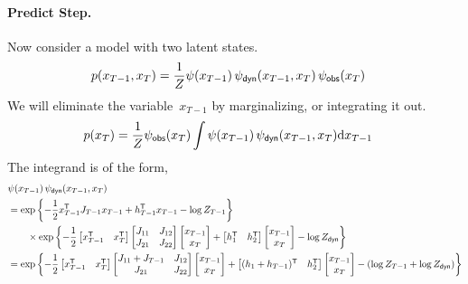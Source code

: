\documentclass{article}
\begin{document}
\paragraph{Predict Step.} Now consider a model with two latent states. 
\begin{align}
  p(x_{T-1}, x_T) &= \frac{1}{Z} \psi(x_{T-1}) \, \psi_{\sf dyn}(x_{T-1}, x_T) \, \psi_{\sf obs}(x_T)
\end{align}
We will eliminate the variable~$x_{T-1}$ by marginalizing, or integrating it out.
\begin{align}
  p(x_T) &= \frac{1}{Z} \psi_{\sf obs}(x_T) \int \psi(x_{T-1}) \, \psi_{\sf dyn}(x_{T-1}, x_T) \mathrm{d}x_{T-1}
\end{align}
The integrand is of the form,
\begin{align}
  &\psi(x_{T-1}) \, \psi_{\sf dyn}(x_{T-1}, x_T)
  \\
  &= \exp \left \{ -\frac{1}{2} x_{T-1}^{\mathsf{T}} J_{T-1} x_{T-1} + h_{T-1}^{\mathsf{T}} x_{T-1} - \log Z_{T-1} \right \} \\
  &\qquad \times 
  \exp \left \{ - \frac{1}{2}
  \begin{bmatrix} x_{T-1}^{\mathsf{T}} & x_T^{\mathsf{T}} \end{bmatrix} 
  \begin{bmatrix} J_{11} & J_{12} \\ J_{21} & J_{22} \end{bmatrix}
  \begin{bmatrix} x_{T-1} \\  x_T \end{bmatrix}
  + \begin{bmatrix} h_1^{\mathsf{T}} & h_2^{\mathsf{T}} \end{bmatrix} 
  \begin{bmatrix} x_{T-1} \\  x_T \end{bmatrix}
  - \log Z_{\sf dyn}
  \right \}
  \\
  &= 
  \exp \left \{ - \frac{1}{2}
  \begin{bmatrix} x_{T-1}^{\mathsf{T}} & x_T^{\mathsf{T}} \end{bmatrix} 
  \begin{bmatrix} J_{11} + J_{T-1} & J_{12} \\ J_{21} & J_{22} \end{bmatrix}
  \begin{bmatrix} x_{T-1} \\  x_T \end{bmatrix}
  + \begin{bmatrix} (h_1 + h_{T-1})^{\mathsf{T}} & h_2^{\mathsf{T}} \end{bmatrix} 
  \begin{bmatrix} x_{T-1} \\  x_T \end{bmatrix}
  - (\log Z_{T-1} + \log Z_{\sf dyn})
  \right \}
\end{align}
\end{document}
